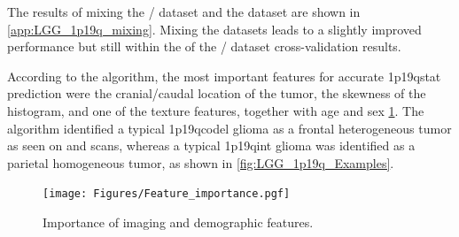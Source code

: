 The results of mixing the / dataset and the  dataset are shown in \cref{app:LGG_1p19q_mixing}.
Mixing the datasets leads to a slightly improved performance but still within the  of the / dataset cross-validation results.

According to the algorithm, the most important features for accurate \acl{1p19qstat} prediction were the cranial/caudal location of the tumor, the skewness of the   histogram, and one of the texture features, together with age and sex \cref{fig:LGG_1p19q_feature_importance}.
The algorithm identified a typical \acl{1p19qcodel} glioma as a frontal heterogeneous tumor as seen on  and  scans, whereas a typical \acl{1p19qint} glioma was identified as a parietal homogeneous tumor, as shown in \cref{fig:LGG_1p19q_Examples}.


\begin{figure}
\centering
\texttt{[image: Figures/Feature\_importance.pgf]}
\caption{Importance of imaging and demographic features.}\label{fig:LGG_1p19q_feature_importance}
\end{figure}


